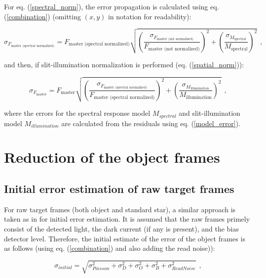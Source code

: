 \documentclass{article}
\begin{document}
\noindent For eq. (\ref{spectral_norm}), the error propagation is calculated using eq. (\ref{combination}) (omitting $(x,y)$ in notation for readability):

\begin{equation}
    \sigma_{F_{\text{master (spectral normalized)}}} = F_{\text{master (spectral normalized)}} \sqrt{\left(\frac{\sigma_{F_{\text{master (not normalized)}}}}{F_{\text{master (not normalized)}}}\right)^2 + \left(\frac{\sigma_{M_{\text{spectral}}}}{M_{\text{spectral}}}\right)^2} \ \ ,
\end{equation}

\noindent and then, if slit-illumination normalization is performed (eq. (\ref{spatial_norm})): 

\begin{equation}
    \sigma_{F_{\text{master}}} = F_{\text{master}} \sqrt{\left(\frac{\sigma_{F_{\text{master (spectral normalized)}}}}{F_{\text{master (spectral normalized)}}}\right)^2 + \left(\frac{\sigma_{M_{\text{illumination}}}}{M_{\text{illumination}}}\right)^2} \ \ ,
\end{equation}

\noindent where the errors for the spectral response model $M_{spectral}$ and slit-illumination model $M_{illumination}$ are calculated from the residuals using eq. (\ref{model_error}).

\section{Reduction of the object frames}

\subsection{Initial error estimation of raw target frames}

For raw target frames (both object and standard star), a similar approach is taken as in \cite[p. 45 - 46]{handbook} for initial error estimation. It is assumed that the raw frames primely consist of the detected light, the dark current (if any is present), and the bias detector level. Therefore, the initial estimate of the error of the object frames is as follows (using eq. (\ref{combination}) and also adding the read noise)): 

\begin{equation}
    \sigma_{initial} = \sqrt{\sigma_{Poisson}^2 + \sigma_{D}^2 + \sigma_{O}^2 + \sigma_{B}^2 + \sigma_{Read Noise}^2} \ \ ,
\end{equation}
\end{document}
